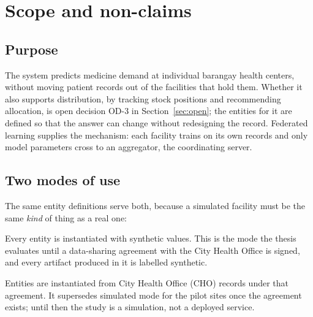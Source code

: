 \section{Scope and non-claims}
\label{sec:scope}

\subsection{Purpose}
The system predicts medicine demand at individual barangay health centers, without moving
patient records out of the facilities that hold them. Whether it also supports distribution,
by tracking stock positions and recommending allocation, is open decision OD-3 in
Section~\ref{sec:open}; the entities for it are defined so that the answer can change without
redesigning the record.
Federated learning supplies the mechanism: each facility trains on its own records and
only model parameters cross to an aggregator, the coordinating server.

\subsection{Two modes of use}
The same entity definitions serve both, because a simulated facility must be the same
\emph{kind} of thing as a real one:
\begin{description}[leftmargin=1.5em,itemsep=0.2em]
  \item[Simulated mode] Every entity is instantiated with synthetic values. This is the mode the
    thesis evaluates until a data-sharing agreement with the City Health Office is signed, and
    every artifact produced in it is labelled synthetic.
  \item[Deployment mode] Entities are instantiated from City Health Office (CHO) records under
    that agreement. It supersedes simulated mode for the pilot sites once the agreement exists;
    until then the study is a simulation, not a deployed service.
\end{description}

